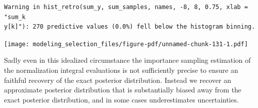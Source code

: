 \documentclass[
  letterpaper,
  DIV=11,
  numbers=noendperiod]{scrartcl}
\newenvironment{Shaded}{\begin{snugshade}}{\end{snugshade}}
\newcommand{\AttributeTok}[1]{\textcolor[rgb]{0.40,0.45,0.13}{#1}}
\newcommand{\ControlFlowTok}[1]{\textcolor[rgb]{0.00,0.23,0.31}{#1}}
\newcommand{\DecValTok}[1]{\textcolor[rgb]{0.68,0.00,0.00}{#1}}
\newcommand{\FloatTok}[1]{\textcolor[rgb]{0.68,0.00,0.00}{#1}}
\newcommand{\FunctionTok}[1]{\textcolor[rgb]{0.28,0.35,0.67}{#1}}
\newcommand{\NormalTok}[1]{\textcolor[rgb]{0.00,0.23,0.31}{#1}}
\newcommand{\OtherTok}[1]{\textcolor[rgb]{0.00,0.23,0.31}{#1}}
\newcommand{\SpecialCharTok}[1]{\textcolor[rgb]{0.37,0.37,0.37}{#1}}
\newcommand{\StringTok}[1]{\textcolor[rgb]{0.13,0.47,0.30}{#1}}
\begin{document}
\begin{Shaded}
\end{Shaded}

\begin{verbatim}
Warning in hist_retro(sum_y, sum_samples, names, -8, 8, 0.75, xlab = "sum_k
y[k]"): 270 predictive values (0.0%) fell below the histogram binning.
\end{verbatim}

\texttt{[image: modeling\_selection\_files/figure-pdf/unnamed-chunk-131-1.pdf]}

Sadly even in this idealized circumstance the importance sampling
estimation of the normalization integral evaluations is not sufficiently
precise to ensure an faithful recovery of the exact posterior
distribution. Instead we recover an approximate posterior distribution
that is substantially biased away from the exact posterior distribution,
and in some cases underestimates uncertainties.
\end{document}
